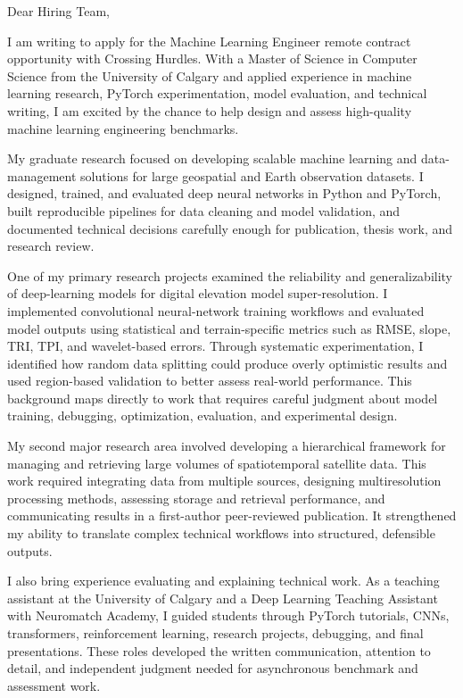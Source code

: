 \documentclass[11pt]{letter}
\begin{document}
\begin{letter}{}

\opening{Dear Hiring Team,}

I am writing to apply for the Machine Learning Engineer remote contract opportunity with Crossing Hurdles. With a Master of Science in Computer Science from the University of Calgary and applied experience in machine learning research, PyTorch experimentation, model evaluation, and technical writing, I am excited by the chance to help design and assess high-quality machine learning engineering benchmarks.

My graduate research focused on developing scalable machine learning and data-management solutions for large geospatial and Earth observation datasets. I designed, trained, and evaluated deep neural networks in Python and PyTorch, built reproducible pipelines for data cleaning and model validation, and documented technical decisions carefully enough for publication, thesis work, and research review.

One of my primary research projects examined the reliability and generalizability of deep-learning models for digital elevation model super-resolution. I implemented convolutional neural-network training workflows and evaluated model outputs using statistical and terrain-specific metrics such as RMSE, slope, TRI, TPI, and wavelet-based errors. Through systematic experimentation, I identified how random data splitting could produce overly optimistic results and used region-based validation to better assess real-world performance. This background maps directly to work that requires careful judgment about model training, debugging, optimization, evaluation, and experimental design.

My second major research area involved developing a hierarchical framework for managing and retrieving large volumes of spatiotemporal satellite data. This work required integrating data from multiple sources, designing multiresolution processing methods, assessing storage and retrieval performance, and communicating results in a first-author peer-reviewed publication. It strengthened my ability to translate complex technical workflows into structured, defensible outputs.

I also bring experience evaluating and explaining technical work. As a teaching assistant at the University of Calgary and a Deep Learning Teaching Assistant with Neuromatch Academy, I guided students through PyTorch tutorials, CNNs, transformers, reinforcement learning, research projects, debugging, and final presentations. These roles developed the written communication, attention to detail, and independent judgment needed for asynchronous benchmark and assessment work.


\end{letter}
\end{document}
